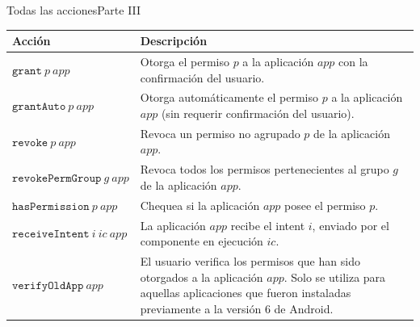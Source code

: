 \documentclass[pdf, handout]{beamer} %
\begin{document}
\begin{frame}{Todas las acciones}{Parte III}
    \fontsize{9pt}{11pt}\selectfont
    \begin{table}
        \begin{tabularx}{\linewidth}{|l X|}
            \hline
            \textbf{Acción}                   & \textbf{Descripción}                                                                                                                                                                   \\
            \hline
            $\mathtt{grant}~p~app$            & Otorga el permiso $p$ a la aplicación $app$ con la confirmación del usuario.                                                                                                           \\
            \hline
            $\mathtt{grantAuto}~p~app$        & Otorga automáticamente el permiso $p$ a la aplicación $app$ (sin requerir confirmación del usuario).                                                                                   \\
            \hline
            $\mathtt{revoke}~p~app$           & Revoca un permiso no agrupado $p$ de la aplicación $app$.                                                                                                                              \\
            \hline
            $\mathtt{revokePermGroup}~g~app$  & Revoca todos los permisos pertenecientes al grupo $g$ de la aplicación $app$.                                                                                                          \\
            \hline
            $\mathtt{hasPermission}~p~app$    & Chequea si la aplicación $app$ posee el permiso $p$.                                                                                                                                   \\
            \hline
            $\mathtt{receiveIntent}~i~ic~app$ & La aplicación $app$ recibe el intent $i$, enviado por el componente en ejecución $ic$.                                                                                                 \\
            \hline
            $\mathtt{verifyOldApp}~app$       & El usuario verifica los permisos que han sido otorgados a la aplicación $app$. Solo se utiliza para aquellas aplicaciones que fueron instaladas previamente a la versión 6 de Android. \\
            \hline
        \end{tabularx}
    \end{table}
\end{frame}
\end{document}
